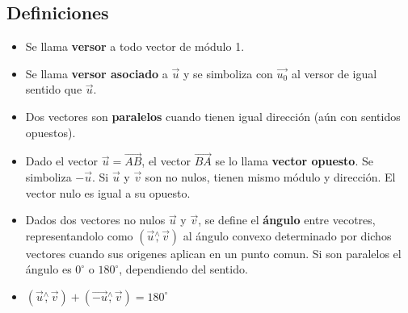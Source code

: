 \documentclass[11pt,a4paper]{article}
\begin{document}
\subsection{Definiciones}
\begin{itemize}
\item Se llama \textbf{versor} a todo vector de m\'odulo 1.
\item Se llama \textbf{versor asociado} a $\overrightarrow{u}$ y se simboliza con $\overrightarrow{u_0}$ al versor de igual sentido que $\overrightarrow{u}$.
\item Dos vectores son \textbf{paralelos} cuando tienen igual direcci\'on (a\'un con sentidos opuestos).\
\item Dado el vector $\overrightarrow{u} = \overrightarrow{AB}$, el vector $\overrightarrow{BA}$ se lo llama \textbf{vector opuesto}. Se simboliza $-\overrightarrow{u}$. Si $\overrightarrow{u}$ y $\overrightarrow{v}$ son no nulos, tienen mismo m\'odulo y direcci\'on. El vector nulo es igual a su opuesto.
\item Dados dos vectores no nulos $\overrightarrow{u}$ y $\overrightarrow{v}$, se define el \textbf{\'angulo} entre vecotres, representandolo como $(\overrightarrow{u}\overset{\wedge}{,}\overrightarrow{v})$ al \'angulo convexo determinado por dichos vectores cuando sus origenes aplican en un punto comun. Si son paralelos el \'angulo es $0^{\circ}$ o $180^{\circ}$, dependiendo del sentido.
\item $(\overrightarrow{u}\overset{\wedge}{,}\overrightarrow{v}) + (\overrightarrow{-u}\overset{\wedge}{,}\overrightarrow{v}) = 180^\circ$
\end{itemize}
\end{document}
